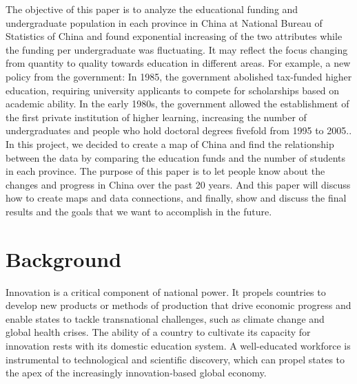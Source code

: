 
The objective of this paper is to analyze the educational funding and undergraduate population in each province in China at National Bureau of Statistics of China and found exponential increasing of the two attributes while the funding per undergraduate was fluctuating. It may reflect the focus changing from quantity to quality towards education in different areas. For example, a new policy from the government: In 1985, the government abolished tax-funded higher education, requiring university applicants to compete for scholarships based on academic ability. In the early 1980s, the government allowed the establishment of the first private institution of higher learning, increasing the number of undergraduates and people who hold doctoral degrees fivefold from 1995 to 2005..\cite{chen2000determinants}\\

\noindent In this project, we decided to create a map of China and find the relationship between the data by comparing the education funds and the number of students in each province. The purpose of this paper is to let people know about the changes and progress in China over the past 20 years. \cite{esteban2014lived}And this paper will discuss how to create maps and data connections, and finally, show and discuss the final results and the goals that we want to accomplish in the future.

\section{Background}
Innovation is a critical component of national power. It propels countries to develop new products or methods of production that drive economic progress and enable states to tackle transnational challenges, such as climate change and global health crises. The ability of a country to cultivate its capacity for innovation rests with its domestic education system. A well-educated workforce is instrumental to technological and scientific discovery, which can propel states to the apex of the increasingly innovation-based global economy.\\

